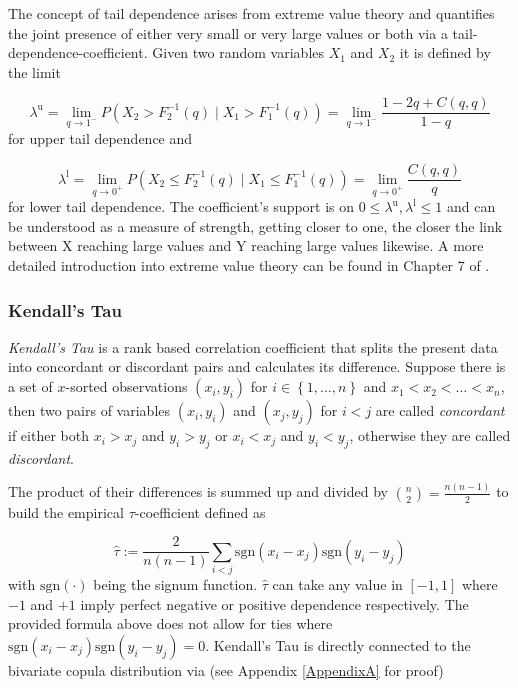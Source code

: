 The concept of tail dependence arises from extreme value theory and quantifies the joint presence of either very small or very large values or both via a tail-dependence-coefficient. Given two random variables $X_1$ and $X_2$ it is defined by the limit

\begin{equation}
	\lambda^{\mathrm{u}}=\lim _{q \rightarrow 1^{-}} P\left(X_{2}>F_{2}^{-1}(q) \mid X_{1}>F_{1}^{-1}(q)\right)=\lim _{q \rightarrow 1^{-}} \frac{1-2 q+C(q, q)}{1-q} 
\end{equation}
%
for upper tail dependence and

\begin{equation}
	\lambda^{\mathrm{l}}=\lim _{q \rightarrow 0^{+}} P\left(X_{2} \leq F_{2}^{-1}(q) \mid X_{1} \leq F_{1}^{-1}(q)\right)=\lim _{q \rightarrow 0^{+}} \frac{C(q, q)}{q}
\end{equation}
%
for lower tail dependence. The coefficient's support is on $0 \leq \lambda^{\mathrm{u}},\lambda^{\mathrm{l}} \leq 1 $ and can be understood as a measure of strength, getting closer to one, the closer the link between X reaching large values and Y reaching large values likewise. A more detailed introduction into extreme value theory can be found in Chapter 7 of \citet{mcneil2015quantitative}.

\subsubsection*{Kendall's Tau}

\textit{Kendall's Tau} \citep*{kendall1938new} is a rank based correlation coefficient that splits the present data into concordant or discordant pairs and calculates its difference. Suppose there is a set of $x$-sorted observations $\left(x_i , y_i \right)$ for $ i \in \left\lbrace 1,\dots ,n \right\rbrace $ and $x_1 <x_2 < \dots < x_n$, then two pairs of variables $\left( x_i , y_i \right) $ and $\left( x_j , y_j \right)$ for $i<j$ are called \textit{concordant} if either both $x_i > x_j$ and $y_i > y_j$ or $x_i < x_j$ and $y_i < y_j$, otherwise they are called \textit{discordant}.

The product of their differences is summed up and divided by $ {n\choose 2} = \frac{n(n-1)}{2}$ to build the empirical $\tau$-coefficient defined as

\begin{equation}
	\label{emp-kendall}
		\hat{\tau}:=\frac{2}{n(n-1)} \sum_{i<j} \mathrm{sgn}\left(x_{i}-x_{j}\right) \mathrm{sgn}\left(y_{i}-y_{j}\right)
\end{equation}
%
with $ \mathrm{sgn}\left(\cdot \right) $ being the signum function. $\hat{\tau}$ can take any value in $\left[ -1,1 \right] $ where $-1$ and $+1$ imply perfect negative or positive dependence respectively. The provided formula above does not allow for ties where $\mathrm{sgn}\left(x_{i}-x_{j}\right) \mathrm{sgn}\left(y_{i}-y_{j}\right) = 0$. Kendall's Tau is directly connected to the bivariate copula distribution via (see Appendix \ref{AppendixA} for proof)

